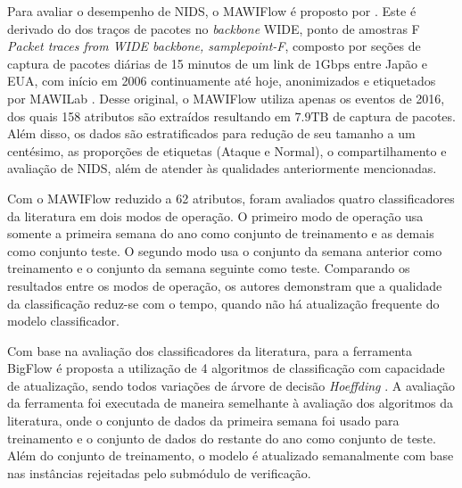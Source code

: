Para avaliar o desempenho de NIDS, o \dataset MAWIFlow é proposto por .
Este \dataset é derivado do
% 
dos traços de pacotes no \emph{backbone} WIDE, ponto de amostras F
% 
\dataset \emph{Packet traces from WIDE backbone, samplepoint-F}, composto por
seções de captura de pacotes diárias de 15 minutos de um link de $1
\mathrm{Gbps}$ entre Japão e EUA, com início em 2006 continuamente até hoje,
anonimizados e etiquetados por MAWILab \cite{mawiSamplepointF,Fontugne2010}.
Desse \dataset original, o \dataset MAWIFlow utiliza apenas os eventos de 2016,
dos quais 158 atributos são extraídos resultando em $7.9 \mathrm{TB}$ de captura de pacotes.
Além disso, os dados são estratificados para redução de seu tamanho a um
centésimo,  as proporções de etiquetas (Ataque e Normal),  o
compartilhamento e avaliação de NIDS, além de atender às qualidades anteriormente
mencionadas.


Com o \dataset MAWIFlow reduzido a 62 atributos, foram avaliados quatro
classificadores da literatura em dois modos de operação.
O primeiro modo de operação usa somente a primeira semana do ano como conjunto
de treinamento e as demais como conjunto teste.
O segundo modo usa o conjunto da semana anterior como treinamento e o
conjunto da semana seguinte como teste.
Comparando os resultados entre os modos de operação, os autores demonstram que a qualidade da
classificação reduz-se com o tempo, quando não há atualização frequente do modelo
classificador.

Com base na avaliação dos classificadores da literatura, para a ferramenta
BigFlow é proposta a utilização de 4 algoritmos de classificação com capacidade
de atualização, sendo todos variações de árvore de decisão
\emph{Hoeffding} \cite{Viegas2019,Domingos2000}.
A avaliação da ferramenta foi executada de maneira semelhante à avaliação
dos algoritmos da literatura, onde o conjunto de dados da primeira semana foi
usado para treinamento e o conjunto de dados do restante do ano como conjunto
de teste.
Além do conjunto de treinamento, o modelo é atualizado semanalmente com base nas
instâncias rejeitadas pelo submódulo de verificação.

